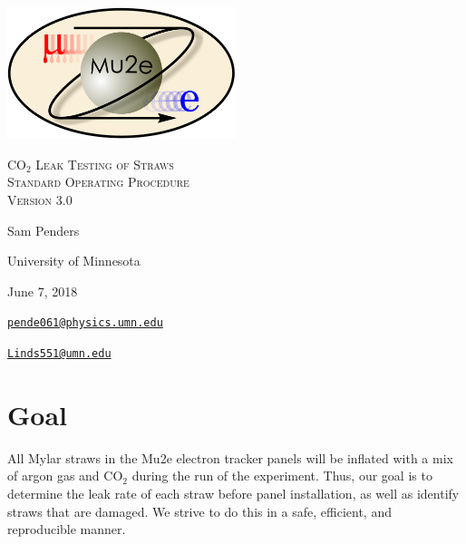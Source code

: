 \documentclass[A4,12pt]{article}
\begin{document}
\begin{titlepage}
	\centering
	\includegraphics[width=0.5\textwidth]{mu2e_logo_oval.png}\par\vspace{2cm}
	{\scshape\LARGE CO$_2$ Leak Testing of Straws \\
		Standard Operating Procedure \\ Version 3.0 \par}
	\vspace{3cm}
	{\Large Sam Penders\par}
    \vspace{.5cm}
	\vspace{3cm}
	{\large University of Minnesota\par}
 	\vspace{.5cm}
	{\large June 7, 2018\par}
	\vfill
	{\href{mailto:pende061@physics.umn.edu}
    {\tt{pende061@physics.umn.edu}}\par}
	
    {\href{Linds551@umn.edu}
    {\tt{Linds551@umn.edu}}\par}
\end{titlepage}

\clearpage
\setcounter{page}{1}

\newenvironment{myitemize} %
{ \begin{itemize}
    \setlength{\itemsep}{4pt}
    \setlength{\parskip}{0pt}
    \setlength{\parsep}{0pt}     }
{ \end{itemize}                  } 

\section{Goal}
All Mylar straws in the Mu2e electron tracker panels will be inflated with a mix of argon gas and CO$_2$ during the run of the experiment. Thus, our goal is to determine the leak rate of each straw before panel installation, as well as identify straws that are damaged. We strive to do this in a safe, efficient, and reproducible manner.
\end{document}

